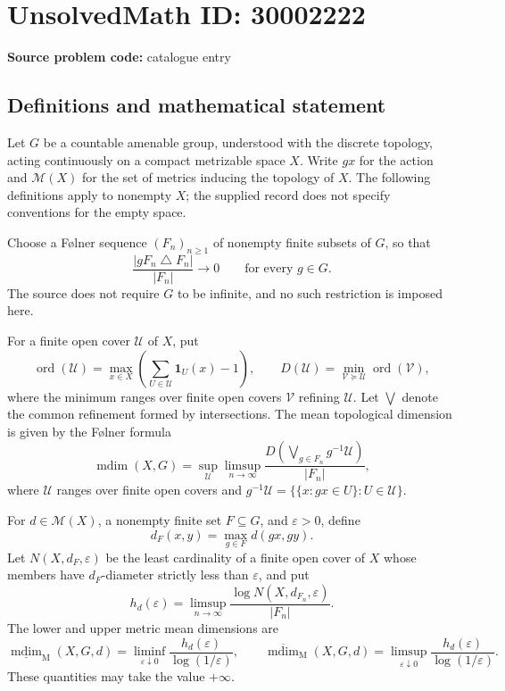 \documentclass[11pt]{article}
\begin{document}
\section*{UnsolvedMath ID: 30002222}
\textbf{Source problem code:} catalogue entry
\subsection{Definitions and mathematical statement}
Let \(G\) be a countable amenable group, understood with the discrete topology, acting continuously on a compact metrizable space \(X\). Write \(gx\) for the action and \(\mathcal M(X)\) for the set of metrics inducing the topology of \(X\). The following definitions apply to nonempty \(X\); the supplied record does not specify conventions for the empty space.

Choose a Følner sequence \((F_n)_{n\geq 1}\) of nonempty finite subsets of \(G\), so that
\[
\frac{|gF_n\mathbin{\triangle}F_n|}{|F_n|}\longrightarrow 0
\qquad\text{for every }g\in G.
\]
The source does not require \(G\) to be infinite, and no such restriction is imposed here.

For a finite open cover \(\mathcal U\) of \(X\), put
\[
\operatorname{ord}(\mathcal U)
=\max_{x\in X}\left(\sum_{U\in\mathcal U}\mathbf 1_U(x)-1\right),
\qquad
D(\mathcal U)=\min_{\mathcal V\succcurlyeq\mathcal U}\operatorname{ord}(\mathcal V),
\]
where the minimum ranges over finite open covers \(\mathcal V\) refining \(\mathcal U\). Let \(\bigvee\) denote the common refinement formed by intersections. The mean topological dimension is given by the Følner formula
\[
\operatorname{mdim}(X,G)
=\sup_{\mathcal U}\limsup_{n\to\infty}
\frac{D\!\left(\bigvee_{g\in F_n}g^{-1}\mathcal U\right)}{|F_n|},
\]
where \(\mathcal U\) ranges over finite open covers and \(g^{-1}\mathcal U=\{\{x:gx\in U\}:U\in\mathcal U\}\).

For \(d\in\mathcal M(X)\), a nonempty finite set \(F\subseteq G\), and \(\varepsilon>0\), define
\[
d_F(x,y)=\max_{g\in F}d(gx,gy).
\]
Let \(N(X,d_F,\varepsilon)\) be the least cardinality of a finite open cover of \(X\) whose members have \(d_F\)-diameter strictly less than \(\varepsilon\), and put
\[
h_d(\varepsilon)=\limsup_{n\to\infty}
\frac{\log N(X,d_{F_n},\varepsilon)}{|F_n|}.
\]
The lower and upper metric mean dimensions are
\[
\underline{\operatorname{mdim}}_{\mathrm M}(X,G,d)
=\liminf_{\varepsilon\downarrow0}
\frac{h_d(\varepsilon)}{\log(1/\varepsilon)},
\qquad
\overline{\operatorname{mdim}}_{\mathrm M}(X,G,d)
=\limsup_{\varepsilon\downarrow0}
\frac{h_d(\varepsilon)}{\log(1/\varepsilon)}.
\]
These quantities may take the value \(+\infty\).
\end{document}
